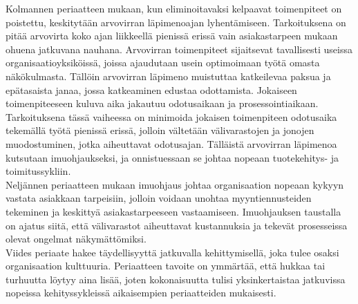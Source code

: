 \documentclass[finnish,12pt,a4paper,pdftex]{article}
\begin{document}
Kolmannen periaatteen mukaan, kun eliminoitavaksi kelpaavat toimenpiteet on poistettu, keskitytään arvovirran läpimenoajan lyhentämiseen. Tarkoituksena on pitää arvovirta koko ajan liikkeellä pienissä erissä vain asiakastarpeen mukaan ohuena jatkuvana nauhana. Arvovirran toimenpiteet sijaitsevat tavallisesti useissa organisaatioyksiköissä, joissa ajaudutaan usein optimoimaan työtä omasta näkökulmasta. Tällöin arvovirran läpimeno muistuttaa katkeilevaa paksua ja epätasaista janaa, jossa katkeaminen edustaa odottamista. Jokaiseen toimenpiteeseen kuluva aika jakautuu odotusaikaan ja prosessointiaikaan. Tarkoituksena tässä vaiheessa on minimoida jokaisen toimenpiteen odotusaika tekemällä työtä pienissä erissä, jolloin vältetään välivarastojen ja jonojen muodostuminen, jotka aiheuttavat odotusajan. Tälläistä arvovirran läpimenoa kutsutaan imuohjaukseksi, ja onnistuessaan se johtaa nopeaan tuotekehitys- ja toimitussykliin.\\

Neljännen periaatteen mukaan imuohjaus johtaa organisaation nopeaan kykyyn vastata asiakkaan tarpeisiin, jolloin voidaan unohtaa myyntiennusteiden tekeminen ja keskittyä asiakastarpeeseen vastaamiseen. Imuohjauksen taustalla on ajatus siitä, että välivarastot aiheuttavat kustannuksia ja tekevät prosesseissa olevat ongelmat näkymättömiksi.\\

Viides periaate hakee täydellisyyttä jatkuvalla kehittymisellä, joka tulee osaksi organisaation kulttuuria. Periaatteen tavoite on ymmärtää, että hukkaa tai turhuutta löytyy aina lisää, joten kokonaisuutta tulisi yksinkertaistaa jatkuvissa nopeissa kehityssykleissä aikaisempien periaatteiden mukaisesti.\\


\end{document}
